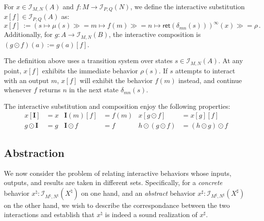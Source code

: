 \documentclass[acmsmall,timestamp,review,anonymous]{acmart}
\newcommand{\kw}[1]{\ensuremath{ \mathsf{#1} }}
\newcommand{\bind}{\gg\!\!=}
\begin{document}
\begin{definition}[Substitution]
For
$x \in \mathcal{I}_{M,N}(A)$ and
$f : M \rightarrow \mathcal{I}_{P,Q}(N)$,
we define the interactive substitution
$x[f] \in \mathcal{I}_{P,Q}(A)$ as:
\[
    x[f] \: :=
      (s \mapsto \mu(s) \bind
       m \mapsto f(m) \bind
       n \mapsto \kw{ret}(\delta_{mn}(s)))^\infty(x) \bind
      \rho \,.
\]
Additionally, for
$g : A \rightarrow \mathcal{I}_{M,N}(B)$,
the interactive composition
is $(g \odot f)(a) := g(a)[f]$.
\end{definition}

The definition above uses a transition system
over states $s \in \mathcal{I}_{M,N}(A)$.
At any point,
$x[f]$ exhibits the immediate behavior $\rho(s)$.
If $s$ attempts to interact with an output $m$,
$x[f]$ will exhibit the behavior $f(m)$ instead,
and continue whenever $f$ returns $n$
in the next state $\delta_{mn}(s)$.

The interactive substitution and composition
enjoy the following properties:
\begin{align*}
  x[\mathbf{I}] &= x &
  \mathbf{I}(m)[f] &= f(m) &
  x[g \odot f] &= x[g][f] \\
  g \odot \mathbf{I} &= g &
  \mathbf{I} \odot f &= f &
  h \odot (g \odot f) &= (h \odot g) \odot f
\end{align*}


\subsection{Abstraction} \label{sec:monad:abs} %

We now consider the problem of relating interactive behaviors
whose inputs, outputs, and results are taken in different sets.
Specifically,
for a \emph{concrete} behavior
$x^\natural : \mathcal{I}_{M^\natural,N^\natural}(X^\natural)$
on one hand, and an \emph{abstract} behavior
$x^\sharp : \mathcal{I}_{M^\sharp,N^\sharp}(X^\sharp)$
on the other hand,
we wish to describe the correspondance between
the two interactions
and establish that
$x^\natural$ is indeed a sound realization of $x^\sharp$.
\end{document}

